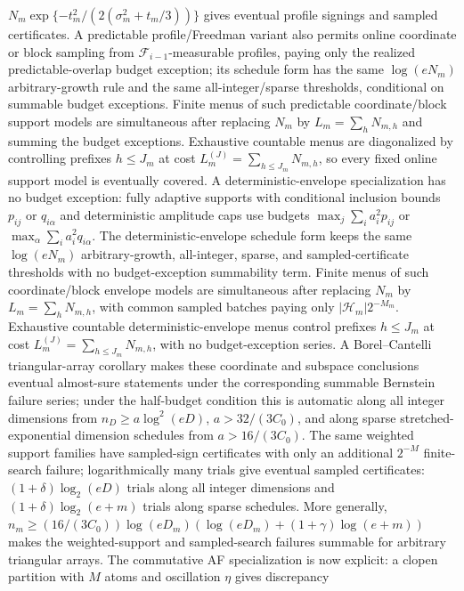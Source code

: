 \documentclass[11pt]{article}
\begin{document}
\(N_m\exp\{-t_m^2/(2(\sigma_m^2+t_m/3))\}\) gives eventual profile signings and
sampled certificates.  A predictable profile/Freedman variant also permits
online coordinate or block sampling from \(\mathcal F_{i-1}\)-measurable
profiles, paying only the realized predictable-overlap budget exception; its
schedule form has the same \(\log(eN_m)\) arbitrary-growth rule and the same
all-integer/sparse thresholds, conditional on summable budget exceptions.
Finite menus of such predictable coordinate/block support models are
simultaneous after replacing \(N_m\) by \(L_m=\sum_hN_{m,h}\) and summing the
budget exceptions.  Exhaustive countable menus are diagonalized by controlling
prefixes \(h\le J_m\) at cost \(L_m^{(J)}=\sum_{h\le J_m}N_{m,h}\), so every
fixed online support model is eventually covered.  A
deterministic-envelope specialization has no budget exception: fully adaptive
supports with conditional inclusion bounds \(p_{ij}\) or \(q_{i\alpha}\) and
deterministic amplitude caps use budgets
\(\max_j\sum_i a_i^2p_{ij}\) or
\(\max_\alpha\sum_i a_i^2q_{i\alpha}\).  The deterministic-envelope schedule
form keeps the same \(\log(eN_m)\) arbitrary-growth, all-integer, sparse, and
sampled-certificate thresholds with no budget-exception summability term.
Finite menus of such coordinate/block envelope models are simultaneous after
replacing \(N_m\) by \(L_m=\sum_hN_{m,h}\), with common sampled batches paying
only \(|\mathcal H_m|2^{-M_m}\).  Exhaustive countable deterministic-envelope
menus control prefixes \(h\le J_m\) at cost
\(L_m^{(J)}=\sum_{h\le J_m}N_{m,h}\), with no budget-exception series.  A
Borel--Cantelli triangular-array corollary makes these
coordinate and subspace conclusions eventual almost-sure statements under the
corresponding summable Bernstein failure series; under the half-budget condition
this is automatic
along all integer dimensions from \(n_D\ge a\log^2(eD)\), \(a>32/(3C_0)\), and
along sparse stretched-exponential dimension schedules from \(a>16/(3C_0)\).
The same weighted support families have
sampled-sign certificates with only an additional \(2^{-M}\) finite-search
failure; logarithmically many trials give eventual sampled certificates:
\((1+\delta)\log_2(eD)\) trials along all integer dimensions and
\((1+\delta)\log_2(e+m)\) trials along sparse schedules.  More generally,
\(n_m\ge(16/(3C_0))\log(eD_m)(\log(eD_m)+(1+\gamma)\log(e+m))\) makes the
weighted-support and sampled-search failures summable for arbitrary triangular
arrays.  The
commutative AF specialization is now explicit: a clopen
partition with \(M\) atoms and oscillation \(\eta\) gives discrepancy
\end{document}
